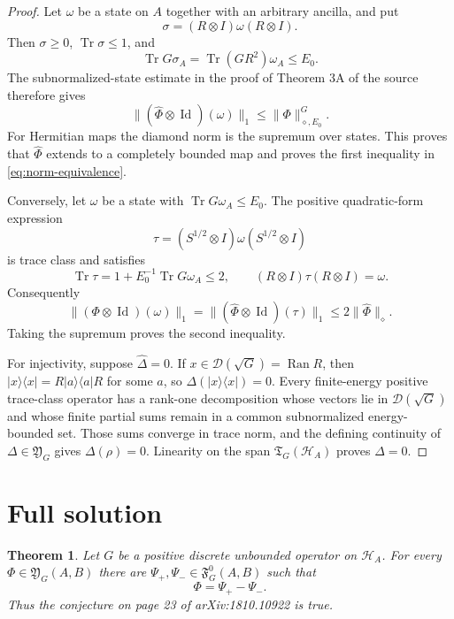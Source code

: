 \documentclass[11pt]{article}
\newtheorem{theorem}{Theorem}
\newcommand{\T}{\mathfrak T}
\newcommand{\Y}{\mathfrak Y}
\newcommand{\F}{\mathfrak F}
\newcommand{\cH}{\mathcal H}
\newcommand{\id}{\operatorname{Id}}
\newcommand{\Tr}{\operatorname{Tr}}
\newcommand{\Ran}{\operatorname{Ran}}
\begin{document}
\begin{proof}
Let $\omega$ be a state on $A$ together with an arbitrary ancilla, and put
\[
 \sigma=(R\otimes I)\omega(R\otimes I).
\]
Then $\sigma\geq0$, $\Tr\sigma\leq1$, and
\[
 \Tr G\sigma_A=\Tr(GR^2)\omega_A\leq E_0.
\]
The subnormalized-state estimate in the proof of Theorem 3A of the source
therefore gives
\[
 \|(\widehat\Phi\otimes\id)(\omega)\|_1
 \leq\|\Phi\|_{\diamond,E_0}^{G}.
\]
For Hermitian maps the diamond norm is the supremum over states.  This proves
that $\widehat\Phi$ extends to a completely bounded map and proves the first
inequality in \eqref{eq:norm-equivalence}.

Conversely, let $\omega$ be a state with $\Tr G\omega_A\leq E_0$.  The
positive quadratic-form expression
\[
 \tau=(S^{1/2}\otimes I)\omega(S^{1/2}\otimes I)
\]
is trace class and satisfies
\[
 \Tr\tau=1+E_0^{-1}\Tr G\omega_A\leq2,
 \qquad (R\otimes I)\tau(R\otimes I)=\omega.
\]
Consequently
\[
 \|(\Phi\otimes\id)(\omega)\|_1
 =\|(\widehat\Phi\otimes\id)(\tau)\|_1
 \leq 2\|\widehat\Phi\|_\diamond.
\]
Taking the supremum proves the second inequality.

For injectivity, suppose $\widehat\Delta=0$.  If
$x\in\mathcal D(\sqrt G)=\Ran R$, then
$|x\rangle\langle x|=R|a\rangle\langle a|R$ for some $a$, so
$\Delta(|x\rangle\langle x|)=0$.  Every finite-energy positive trace-class
operator has a rank-one decomposition whose vectors lie in
$\mathcal D(\sqrt G)$ and whose finite partial sums remain in a common
subnormalized energy-bounded set.  Those sums converge in trace norm, and
the defining continuity of $\Delta\in\Y_G$ gives $\Delta(\rho)=0$.
Linearity on the span $\T_G(\cH_A)$ proves $\Delta=0$.
\end{proof}

\section{Full solution}

\begin{theorem}\label{thm:main}
Let $G$ be a positive discrete unbounded operator on $\cH_A$.  For every
$\Phi\in\Y_G(A,B)$ there are $\Psi_+,\Psi_-\in\F_G^0(A,B)$ such that
\[
 \Phi=\Psi_+-\Psi_-.
\]
Thus the conjecture on page 23 of arXiv:1810.10922 is true.
\end{theorem}
\end{document}
